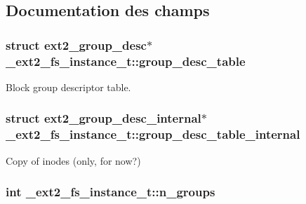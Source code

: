 \subsection{Documentation des champs}
\hypertarget{struct__ext2__fs__instance__t_acc01ef58cbc6cfa9d3ff4e08709a561a}{
\subsubsection[{group\+\_\+desc\+\_\+table}]{\setlength{\rightskip}{0pt plus 5cm}struct {\bf ext2\+\_\+group\+\_\+desc}$\ast$ \+\_\+ext2\+\_\+fs\+\_\+instance\+\_\+t\+::group\+\_\+desc\+\_\+table}}\label{struct__ext2__fs__instance__t_acc01ef58cbc6cfa9d3ff4e08709a561a}
Block group descriptor table. \hypertarget{struct__ext2__fs__instance__t_a9db69a1265be4c818005d18add117790}{
\subsubsection[{group\+\_\+desc\+\_\+table\+\_\+internal}]{\setlength{\rightskip}{0pt plus 5cm}struct {\bf ext2\+\_\+group\+\_\+desc\+\_\+internal}$\ast$ \+\_\+ext2\+\_\+fs\+\_\+instance\+\_\+t\+::group\+\_\+desc\+\_\+table\+\_\+internal}}\label{struct__ext2__fs__instance__t_a9db69a1265be4c818005d18add117790}
Copy of inodes (only, for now?) \hypertarget{struct__ext2__fs__instance__t_a81a5e5b8f7d46d744c96a4f28317e59f}{
\subsubsection[{n\+\_\+groups}]{\setlength{\rightskip}{0pt plus 5cm}int \+\_\+ext2\+\_\+fs\+\_\+instance\+\_\+t\+::n\+\_\+groups}}\label{struct__ext2__fs__instance__t_a81a5e5b8f7d46d744c96a4f28317e59f}
